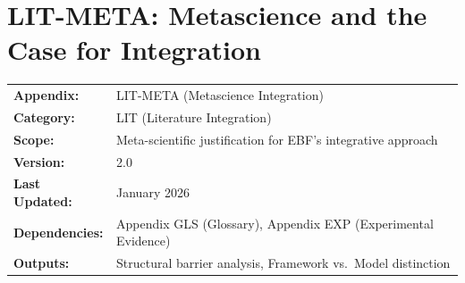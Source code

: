 %
%
%
%
%

\chapter{LIT-META: Metascience and the Case for Integration}
\label{app:lit-meta}


\begin{tcolorbox}[colback=orange!5!white, colframe=orange!75!black,
    title=\textbf{Appendix MSC: Literature Integration}]

\begin{tabular}{@{}ll@{}}
\textbf{Appendix:} & LIT-META (Metascience Integration) \\
\textbf{Category:} & LIT (Literature Integration) \\
\textbf{Scope:} & Meta-scientific justification for EBF's integrative approach \\
\textbf{Version:} & 2.0 \\
\textbf{Last Updated:} & January 2026 \\
\textbf{Dependencies:} & Appendix GLS (Glossary), Appendix EXP (Experimental Evidence) \\
\textbf{Outputs:} & Structural barrier analysis, Framework vs.\ Model distinction \\
\end{tabular}

\end{tcolorbox}


